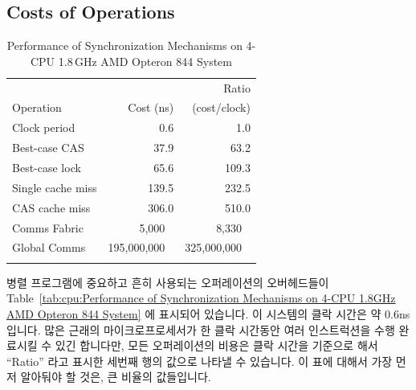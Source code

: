 \subsection{Costs of Operations}
\label{sec:cpu:Costs of Operations}

\begin{table}
\small
\centering
\begin{tabular}{l||r|r}
				& 	 	& Ratio \\
	Operation		& Cost (ns) 	& (cost/clock) \\
	\hline
	\hline
	Clock period		&           0.6	&           1.0 \\
	\hline
	Best-case CAS		&          37.9	&          63.2 \\
	\hline
	Best-case lock		&          65.6	&         109.3 \\
	\hline
	Single cache miss	&         139.5	&         232.5 \\
	\hline
	CAS cache miss		&         306.0	&         510.0 \\
	\hline
	Comms Fabric		&       5,000\textcolor{white}{.0}
						&       8,330\textcolor{white}{.0}
								\\
	\hline
	Global Comms		& 195,000,000\textcolor{white}{.0}
						& 325,000,000\textcolor{white}{.0} \\
								\\
\end{tabular}
\caption{Performance of Synchronization Mechanisms on 4-CPU 1.8\,GHz AMD Opteron 844 System}
\label{tab:cpu:Performance of Synchronization Mechanisms on 4-CPU 1.8GHz AMD Opteron 844 System}
\end{table}

병렬 프로그램에 중요하고 흔히 사용되는 오퍼레이션의 오버헤드들이
Table~\ref{tab:cpu:Performance of Synchronization Mechanisms on 4-CPU 1.8GHz
AMD Opteron 844 System} 에 표시되어 있습니다.
이 시스템의 클락 시간은 약 0.6ns 입니다.
많은 근래의 마이크로프로세서가 한 클락 시간동안 여러 인스트럭션을 수행 완료시킬
수 있긴 합니다만, 모든 오퍼레이션의 비용은 클락 시간을 기준으로 해서 ``Ratio''
라고 표시한 세번째 행의 값으로 나타낼 수 있습니다.
이 표에 대해서 가장 먼저 알아둬야 할 것은, 큰 비율의 값들입니다.

